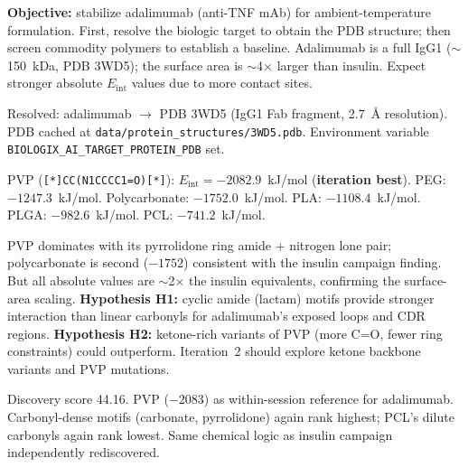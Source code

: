 \documentclass[twocolumn]{fairmeta}
\begin{document}
\begin{agentthought}
\scriptsize
\textbf{Objective:} stabilize adalimumab (anti-TNF mAb) for ambient-temperature formulation.
First, resolve the biologic target to obtain the PDB structure; then screen commodity polymers to establish a baseline.
Adalimumab is a full IgG1 (${\sim}$150~kDa, PDB 3WD5); the surface area is ${\sim}$4$\times$ larger than insulin.
Expect stronger absolute $E_\text{int}$ values due to more contact sites.
\end{agentthought}

\begin{toolcall}
\scriptsize
Resolved: adalimumab $\to$ PDB 3WD5 (IgG1 Fab fragment, 2.7~\AA{} resolution).
PDB cached at \texttt{data/protein\_structures/3WD5.pdb}.
Environment variable \texttt{BIOLOGIX\_AI\_TARGET\_PROTEIN\_PDB} set.
\end{toolcall}

\begin{toolcall}
\scriptsize
PVP (\texttt{[*]CC(N1CCCC1=O)[*]}): $E_\text{int} = -2082.9$~kJ/mol (\textbf{iteration best}).
PEG: $-1247.3$~kJ/mol.
Polycarbonate: $-1752.0$~kJ/mol.
PLA: $-1108.4$~kJ/mol.
PLGA: $-982.6$~kJ/mol.
PCL: $-741.2$~kJ/mol.
\end{toolcall}

\begin{agentthought}
\scriptsize
PVP dominates with its pyrrolidone ring amide + nitrogen lone pair; polycarbonate is second ($-1752$) consistent with the insulin campaign finding.
But all absolute values are ${\sim}$2$\times$ the insulin equivalents, confirming the surface-area scaling.
\textbf{Hypothesis H1:} cyclic amide (lactam) motifs provide stronger interaction than linear carbonyls for adalimumab's exposed loops and CDR regions.
\textbf{Hypothesis H2:} ketone-rich variants of PVP (more C=O, fewer ring constraints) could outperform.
Iteration~2 should explore ketone backbone variants and PVP mutations.
\end{agentthought}

\begin{observation}
\scriptsize
Discovery score 44.16.
PVP ($-2083$) as within-session reference for adalimumab.
Carbonyl-dense motifs (carbonate, pyrrolidone) again rank highest; PCL's dilute carbonyls again rank lowest.
Same chemical logic as insulin campaign independently rediscovered.
\end{observation}
\end{document}
